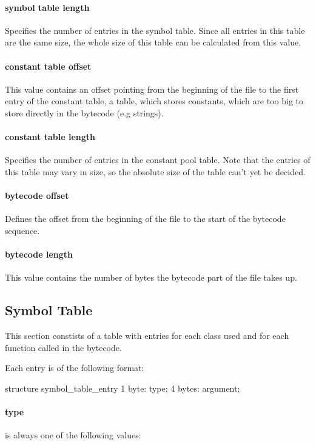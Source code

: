 \documentclass[12pt]{article}
\begin{document}
\paragraph{symbol table length}
    Specifies the number of entries in the symbol table. Since all entries in this table
    are the same size, the whole size of this table can be calculated from this value.

\paragraph{constant table offset}
    This value contains an offset pointing from the beginning of the file to the first entry
    of the constant table, a table, which stores constants, which are too big to store
    directly in the bytecode (e.g strings). 

\paragraph{constant table length}
    Specifies the number of entries in the constant pool table. Note that the entries of this
    table may vary in size, so the absolute size of the table can't yet be decided.

\paragraph{bytecode offset}
    Defines the offset from the beginning of the file to the start of the bytecode sequence.

\paragraph{bytecode length}
    This value contains the number of bytes the bytecode part of the file takes up.

\subsection*{Symbol Table}
This section constists of a table with entries for each class used and for each function called in the bytecode.

Each entry is of the following format:

\begin{code}[language=C]
structure symbol_table_entry {
    1 byte:  type;
    4 bytes: argument;
}
\end{code}

\paragraph{type} is always one of the following values:
 
\end{document}
